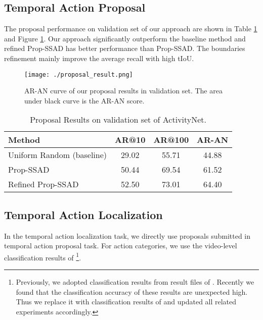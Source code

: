 \documentclass[10pt,twocolumn,letterpaper]{article}
\begin{document}
\subsection{Temporal Action Proposal}

The proposal performance on validation set of our approach are shown in Table \ref{result_proposal} and Figure \ref{result_proposal_img}. Our approach significantly outperform the baseline method and refined Prop-SSAD has better performance than Prop-SSAD. The boundaries refinement mainly improve the average recall with high tIoU. 

\begin{figure}[tbp]
\centering
\begin{minipage}[b]{1.0\linewidth}
  \centering
  \centerline{\texttt{[image: ./proposal\_result.png]}}
\medskip
\end{minipage}
\caption{AR-AN curve of our proposal results in validation set. The area under black curve is the AR-AN score.
}
\label{result_proposal_img}
\end{figure}

\begin{table}[!tbp]

\centering
\caption{Proposal Results on validation set of ActivityNet.}
\small
\begin{tabular}{p{3cm}<{\centering}ccc<{\centering}}
\toprule
Method  & AR@10 & AR@100  & AR-AN  \\
\midrule Uniform Random (baseline)  & 29.02 & 55.71 & 44.88 \\
Prop-SSAD  & 50.44 & 69.54 & 61.52 \\
Refined Prop-SSAD & 52.50 & 73.01 & 64.40 \\
\bottomrule
\end{tabular}
\label{result_proposal}
\normalsize
\end{table}




\subsection{Temporal Action Localization}

In the temporal action localization task, we directly use  proposals submitted in temporal action proposal task. For action categories, we use the video-level classification results of \cite{zhao2017cuhk}\footnote{Previously, we adopted classification results from result files of \cite{wang2016uts}. Recently we found that the classification accuracy of these results are unexpected high. Thus we replace it with classification results of \cite{zhao2017cuhk} and updated all related experiments accordingly.}. 
\end{document}
